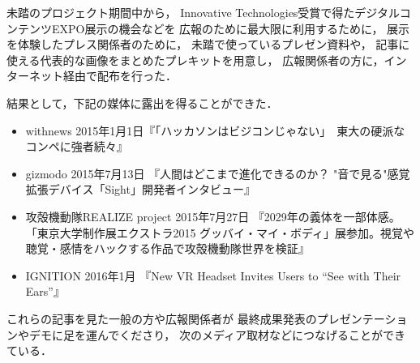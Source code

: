 未踏のプロジェクト期間中から，
Innovative Technologies受賞で得たデジタルコンテンツEXPO展示の機会などを
広報のために最大限に利用するために，
展示を体験したプレス関係者のために，
未踏で使っているプレゼン資料や，
記事に使える代表的な画像をまとめたプレキットを用意し，
広報関係者の方に，インターネット経由で配布を行った．

結果として，下記の媒体に露出を得ることができた．

\begin{itemize}
 \item withnews 2015年1月1日『「ハッカソンはビジコンじゃない」　東大の硬派なコンペに強者続々』
 \item gizmodo 2015年7月13日 『人間はどこまで進化できるのか？ "音で見る"感覚拡張デバイス「Sight」開発者インタビュー』
 \item 攻殻機動隊REALIZE project 2015年7月27日 『2029年の義体を一部体感。「東京大学制作展エクストラ2015 グッバイ・マイ・ボディ」展参加。視覚や聴覚・感情をハックする作品で攻殻機動隊世界を検証』
 \item IGNITION 2016年1月 『New VR Headset Invites Users to “See with Their Ears”』
\end{itemize}


これらの記事を見た一般の方や広報関係者が
最終成果発表のプレゼンテーションやデモに足を運んでくださり，
次のメディア取材などにつなげることができている．
